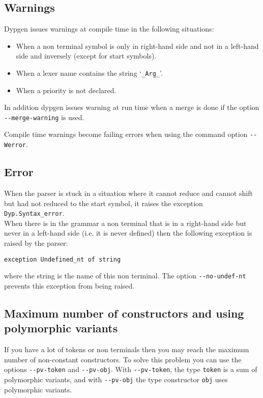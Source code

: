 \documentclass[12pt]{article}
\begin{document}
{\subsection{Warnings}

Dypgen issues warnings at compile time in the following situations:
\begin{itemize}
\item When a non terminal symbol is only in right-hand side and not in a left-hand side and inversely (except for start symbols).
\item When a lexer name contains the string `\verb|_Arg_|'.
\item When a priority is not declared.
\end{itemize}

In addition dypgen issues warning at run time when a merge is done if the option \verb|--merge-warning| is used.

Compile time warnings become failing errors when using the command option \verb|--Werror|.

\subsection{Error}

When the parser is stuck in a situation where it cannot reduce and cannot shift but had not reduced to the start symbol, it raises the exception \verb|Dyp.Syntax_error|.\\

When there is in the grammar a non terminal that is in a right-hand side but never in a left-hand side (i.e. it is never defined) then the following exception is raised by the parser:
\begin{verbatim}
exception Undefined_nt of string
\end{verbatim}
where the string is the name of this non terminal. The option \verb|--no-undef-nt| prevents this exception from being raised.

\subsection{Maximum number of constructors and using polymorphic variants}\label{--pv-obj}

If you have a lot of tokens or non terminals then you may reach the maximum number of non-constant constructors. To solve this problem you can use the options \verb|--pv-token| and \verb|--pv-obj|. With \verb|--pv-token|, the type \verb|token| is a sum of polymorphic variants, and with \verb|--pv-obj| the type constructor \verb|obj| uses polymorphic variants.

}
\end{document}
